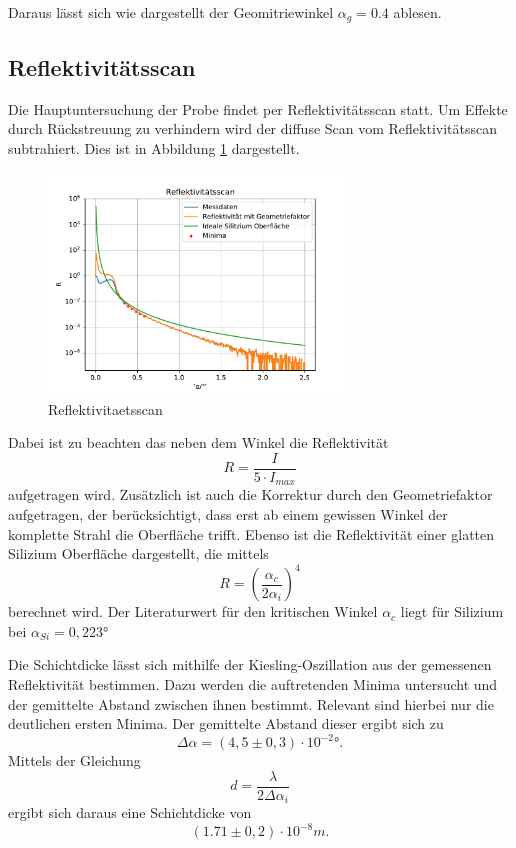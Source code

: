 Daraus lässt sich wie dargestellt der Geomitriewinkel $\alpha_g = 0.4$ ablesen.



\subsection{Reflektivitätsscan}
Die Hauptuntersuchung der Probe findet per Reflektivitätsscan statt.
Um Effekte durch Rückstreuung zu verhindern wird der diffuse Scan vom Reflektivitätsscan subtrahiert.
Dies ist in Abbildung \ref{fig:ref} dargestellt.
\begin{figure}[h]
    \centering
    \includegraphics[width = 0.7\textwidth]{Auswertung/Graphen/Reflektivitaetsscan.pdf}
    \caption{Reflektivitaetsscan}
    \label{fig:ref}
\end{figure}
Dabei ist zu beachten das neben dem Winkel die Reflektivität
\begin{equation*}
    R = \frac{I}{5\cdot I_{max}} 
\end{equation*}
aufgetragen wird.
Zusätzlich ist auch die Korrektur durch den Geometriefaktor aufgetragen,
der berücksichtigt,
dass erst ab einem gewissen Winkel der komplette Strahl die Oberfläche trifft.
Ebenso ist die Reflektivität einer glatten Silizium Oberfläche dargestellt,
die mittels
\begin{equation}
    R = \left(\frac{\alpha_c}{2\alpha_i}\right)^4
\end{equation}
berechnet wird. 
Der Literaturwert für den kritischen Winkel $\alpha_c$ liegt für Silizium bei $\alpha_{Si} = 0,223°$ \cite{wert}

Die Schichtdicke lässt sich mithilfe der Kiesling-Oszillation aus der gemessenen Reflektivität bestimmen.
Dazu werden die auftretenden Minima untersucht und der gemittelte Abstand zwischen ihnen bestimmt.
Relevant sind hierbei nur die deutlichen ersten Minima.
Der gemittelte Abstand dieser ergibt sich zu
\begin{equation}
    \Delta\alpha = (4,5 \pm 0,3)\cdot10^{-2}°.
\end{equation}
Mittels der Gleichung
\begin{equation}
    d = \frac{\lambda}{2\Delta\alpha_i}
\end{equation}
ergibt sich daraus eine Schichtdicke von
\begin{equation}
    (1.71 \pm 0,2)\cdot 10^{-8} m.
\end{equation}


